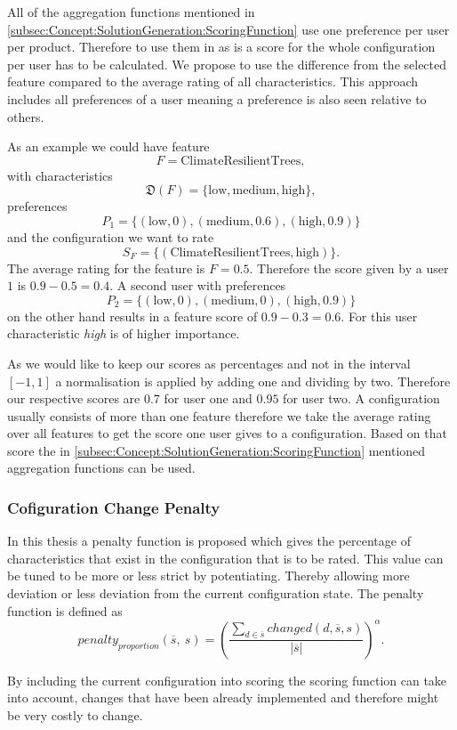 All of the aggregation functions mentioned in \autoref{subsec:Concept:SolutionGeneration:ScoringFunction} use one preference per user per product. Therefore to use them in as is a score for the whole configuration per user has to be calculated. We propose to use the difference from the selected feature compared to the average rating of all characteristics. This approach includes all preferences of a user meaning a preference is also seen relative to others.

As an example we could have feature
\begin{equation}
    F = \text{ClimateResilientTrees},
\end{equation} with characteristics
\begin{equation}
    \mathfrak{D}(F)= \{\text{low}, \text{medium}, \text{high}\},
\end{equation}
preferences
\begin{equation}
    P_1 = \{(\text{low}, 0), (\text{medium},0.6), (\text{high},0.9) \}
\end{equation} 
and the configuration we want to rate
\begin{equation}
    S_F = \{(\text{ClimateResilientTrees}, \text{high})\}.
\end{equation}
The average rating for the feature is $F = 0.5$. Therefore the score given by a user $1$ is $0.9-0.5 = 0.4$.
A second user with preferences 
\begin{equation}
    P_2 = \{(\text{low}, 0), (\text{medium},0), (\text{high},0.9) \}
\end{equation} 
on the other hand results in a feature score of $0.9-0.3=0.6$. For this user characteristic \emph{high} is of higher importance.

As we would like to keep our scores as percentages and not in the interval $[-1,1]$ a normalisation is applied by adding one and dividing by two. Therefore our respective scores are $0.7$ for user one and $0.95$ for user two. A configuration usually consists of more than one feature therefore we take the average rating over all features to get the score one user gives to a configuration. Based on that score the in \autoref{subsec:Concept:SolutionGeneration:ScoringFunction} mentioned aggregation functions can be used.

\subsubsection{Cofiguration Change Penalty}

In this thesis a penalty function is proposed which gives the percentage of characteristics that exist in the configuration that is to be rated. This value can be tuned to be more or less strict by potentiating. Thereby allowing more deviation or less deviation from the current configuration state. The penalty function is defined as
\begin{equation}
    penalty_{proportion}(\overline{s},\ s) =  \left(\frac{\sum_{d \in \overline{s}} changed(d,\overline{s}, s)}{|\overline{s}|}\right)^\alpha.
\end{equation}

By including the current configuration into scoring the scoring function can take into account, changes that have been already implemented and therefore might be very costly to change.
    
